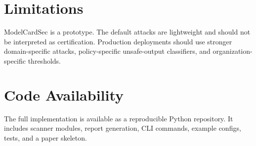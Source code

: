 \documentclass[10pt,conference]{IEEEtran}
\begin{document}
\section{Limitations}
ModelCardSec is a prototype. The default attacks are lightweight and should not be interpreted as certification. Production deployments should use stronger domain-specific attacks, policy-specific unsafe-output classifiers, and organization-specific thresholds.

\section{Code Availability}
The full implementation is available as a reproducible Python repository. It includes scanner modules, report generation, CLI commands, example configs, tests, and a paper skeleton.



\end{document}
